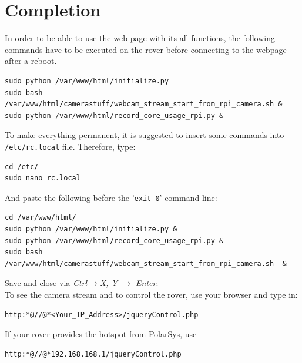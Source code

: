 \section{Completion}
In order to be able to use the web-page with its all functions, the following commands have to be executed on the rover before connecting to the webpage after a reboot.
\begin{lstlisting}
sudo python /var/www/html/initialize.py
sudo bash /var/www/html/camerastuff/webcam_stream_start_from_rpi_camera.sh &
sudo python /var/www/html/record_core_usage_rpi.py &
\end{lstlisting}
To make everything permanent, it is suggested to insert some commands into \texttt{/etc/rc.local} file. Therefore, type:
\begin{lstlisting}
cd /etc/
sudo nano rc.local
\end{lstlisting}
And paste the following before the '\texttt{exit 0}' command line: 
\begin{lstlisting}
cd /var/www/html/
sudo python /var/www/html/initialize.py &
sudo python /var/www/html/record_core_usage_rpi.py &
sudo bash /var/www/html/camerastuff/webcam_stream_start_from_rpi_camera.sh  &
\end{lstlisting}
Save and close via  \textit{Ctrl}$\rightarrow$\textit{X, Y }$\rightarrow$ \textit{Enter}.\\
To see the camera stream and to control the rover, use your browser and type in:
\begin{lstlisting}[label={lst:1}]
http:*@//@*<Your_IP_Address>/jqueryControl.php
\end{lstlisting}
If your rover provides the hotspot from PolarSys, use
\begin{lstlisting}[label={lst:partWrkflw}]
http:*@//@*192.168.168.1/jqueryControl.php
\end{lstlisting}
